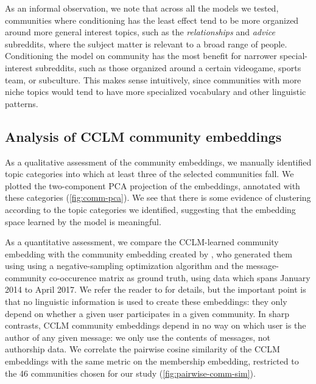 \documentclass[11pt,a4paper]{article}
\begin{document}
As an informal observation, we note 
that across all the models we tested, 
communities where conditioning has the least effect
tend to be more organized around more general interest topics,
such as the \emph{relationships} and \emph{advice} subreddits, where the subject matter is relevant to a broad
range of people.
Conditioning the model on community has the most benefit
for narrower special-interest subreddits, such as those organized
around a certain videogame, sports team, or subculture.
This makes sense intuitively, since communities with more niche topics
would tend to have more specialized vocabulary and other linguistic patterns.

\subsection{Analysis of CCLM community embeddings}

As a qualitative assessment of the community embeddings, 
we manually identified topic categories into which at least three
of the selected communities fall.
We plotted the two-component PCA projection of the embeddings,
annotated with these categories (\cref{fig:comm-pca}).
We see that there is some evidence of clustering according to
the topic categories we identified,
suggesting that the embedding space learned by the model is meaningful.

\begin{figure*}
\caption{Community embedding PCA of the best LSTM (left, $c=1$) and transformer (right, $c=3$) models.}
\label{fig:comm-pca}
\end{figure*}

As a quantitative assessment, we compare the CCLM-learned community
embedding with the community embedding created by \citet{Kumar2018},
who generated them using using a negative-sampling optimization
algorithm and the message-community co-occurence matrix as ground
truth, using data which spans January 2014 to April 2017.
We refer the reader
to \citet{Kumar2018}
for details, but the important point is that no linguistic
information is used to create these embeddings: they only depend on
whether a given user participates in a given
community. In sharp contrasts, CCLM community embeddings depend in no
way on which user is the author of any given message: we only use the
contents of messages, not authorship data.
%
We correlate the pairwise cosine similarity of the
CCLM embeddings with the same metric on the membership embedding,
restricted to the 46 communities chosen for our study
(\cref{fig:pairwise-comm-sim}).
\end{document}
